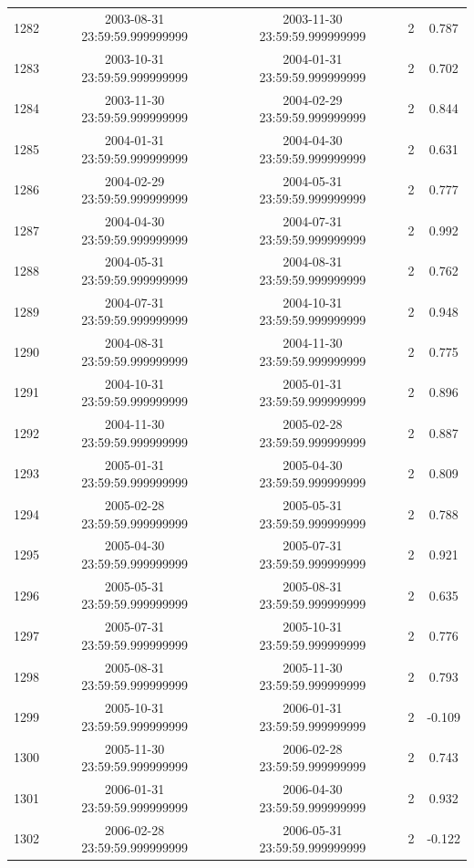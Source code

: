 \begin{table}
\begin{tabular}{lcccc}
1282 & 2003-08-31 23:59:59.999999999 & 2003-11-30 23:59:59.999999999 & 2 & 0.787 \\
1283 & 2003-10-31 23:59:59.999999999 & 2004-01-31 23:59:59.999999999 & 2 & 0.702 \\
1284 & 2003-11-30 23:59:59.999999999 & 2004-02-29 23:59:59.999999999 & 2 & 0.844 \\
1285 & 2004-01-31 23:59:59.999999999 & 2004-04-30 23:59:59.999999999 & 2 & 0.631 \\
1286 & 2004-02-29 23:59:59.999999999 & 2004-05-31 23:59:59.999999999 & 2 & 0.777 \\
1287 & 2004-04-30 23:59:59.999999999 & 2004-07-31 23:59:59.999999999 & 2 & 0.992 \\
1288 & 2004-05-31 23:59:59.999999999 & 2004-08-31 23:59:59.999999999 & 2 & 0.762 \\
1289 & 2004-07-31 23:59:59.999999999 & 2004-10-31 23:59:59.999999999 & 2 & 0.948 \\
1290 & 2004-08-31 23:59:59.999999999 & 2004-11-30 23:59:59.999999999 & 2 & 0.775 \\
1291 & 2004-10-31 23:59:59.999999999 & 2005-01-31 23:59:59.999999999 & 2 & 0.896 \\
1292 & 2004-11-30 23:59:59.999999999 & 2005-02-28 23:59:59.999999999 & 2 & 0.887 \\
1293 & 2005-01-31 23:59:59.999999999 & 2005-04-30 23:59:59.999999999 & 2 & 0.809 \\
1294 & 2005-02-28 23:59:59.999999999 & 2005-05-31 23:59:59.999999999 & 2 & 0.788 \\
1295 & 2005-04-30 23:59:59.999999999 & 2005-07-31 23:59:59.999999999 & 2 & 0.921 \\
1296 & 2005-05-31 23:59:59.999999999 & 2005-08-31 23:59:59.999999999 & 2 & 0.635 \\
1297 & 2005-07-31 23:59:59.999999999 & 2005-10-31 23:59:59.999999999 & 2 & 0.776 \\
1298 & 2005-08-31 23:59:59.999999999 & 2005-11-30 23:59:59.999999999 & 2 & 0.793 \\
1299 & 2005-10-31 23:59:59.999999999 & 2006-01-31 23:59:59.999999999 & 2 & -0.109 \\
1300 & 2005-11-30 23:59:59.999999999 & 2006-02-28 23:59:59.999999999 & 2 & 0.743 \\
1301 & 2006-01-31 23:59:59.999999999 & 2006-04-30 23:59:59.999999999 & 2 & 0.932 \\
1302 & 2006-02-28 23:59:59.999999999 & 2006-05-31 23:59:59.999999999 & 2 & -0.122 \\

\end{tabular}
\end{table}

